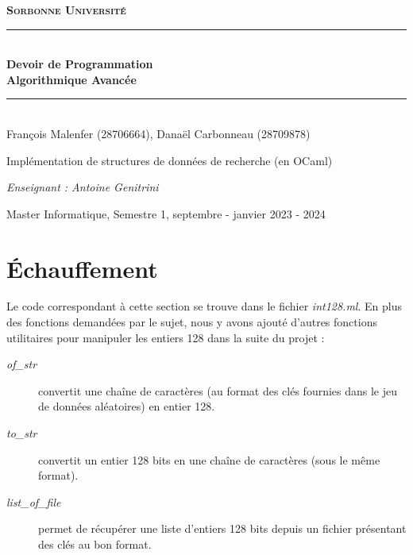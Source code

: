 \documentclass[12pt,a4paper]{article}
\author{Javaid Mohammad-Habib, Carbonneau Danaël}
\begin{document}
\begin{titlepage}
\newcommand{\HRule}{\rule{\linewidth}{0.5mm}}



\center 
\bigskip
\textsc{\LARGE\textbf{
\color{teal}Sorbonne Université}
}
 \\[4cm]
 {\color{Bittersweet}\HRule} \\[0.4cm]
{ \huge \bfseries \color{darkgray} Devoir de Programmation \\[0.15cm] }
\textbf{Algorithmique Avancée}
{\color{Bittersweet}\HRule} \\[0.5cm]

{\color{darkgray} François Malenfer (28706664), Danaël Carbonneau (28709878)} \\[3cm]

\begin{huge}
{\selectfont
Implémentation de structures de données de recherche (en OCaml)
}
\end{huge}


\vfill

\textit{Enseignant : Antoine Genitrini}

Master Informatique, Semestre 1, septembre - janvier 2023 - 2024 \\ [1cm]

\end{titlepage}



\tableofcontents

\newpage

\section{Échauffement}
Le code correspondant à cette section se trouve dans le fichier \textit{int128.ml}. En plus des fonctions demandées par le sujet, nous y avons ajouté d'autres fonctions utilitaires pour manipuler les entiers 128 dans la suite du projet : 

\begin{description}

\item[\textit{of\_str}] convertit une chaîne de caractères (au format des clés fournies dans le jeu de données aléatoires) en entier 128.
\item[\textit{to\_str}] convertit un entier 128 bits en une chaîne de caractères (sous le même format).
\item[\textit{list\_of\_file}] permet de récupérer une liste d'entiers 128 bits depuis un fichier présentant des clés au bon format.
\end{description}
\end{document}

